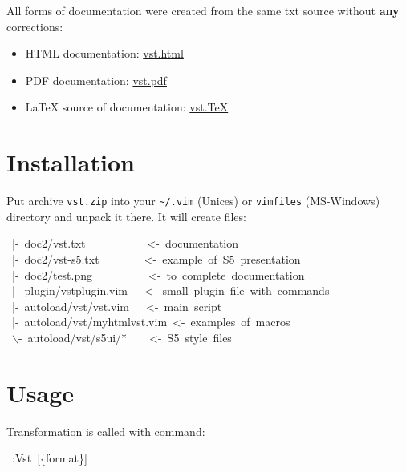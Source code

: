 \documentclass[12pt]{article}
\begin{document}
All forms of documentation were created from the same txt source without
\textbf{any} corrections:

\begin{itemize}
\item
HTML documentation: \href{http://skawina.eu.org/mikolaj/vst.html}{vst.html}

\item
PDF documentation: \href{http://skawina.eu.org/mikolaj/vst.pdf}{vst.pdf}

\item
\LaTeX{} source of documentation: \href{http://skawina.eu.org/mikolaj/vst.TeX}{vst.\TeX{}}
\end{itemize}

\hypertarget{larchive}{}

\hypertarget{linstallation}{}
\section{Installation}

Put archive \texttt{vst.zip} into your \texttt{\~{}/.vim} (Unices) or \texttt{vimfiles}
(MS-Windows) directory and unpack it there. It will create files:

\begin{ttfamily}\begin{flushleft}
\mbox{~|-~doc2/vst.txt~~~~~~~~~~~<-~documentation}\\
\mbox{~|-~doc2/vst-s5.txt~~~~~~~~<-~example~of~S5~presentation}\\
\mbox{~|-~doc2/test.png~~~~~~~~~~<-~to~complete~documentation}\\
\mbox{~|-~plugin/vstplugin.vim~~~<-~small~plugin~file~with~commands}\\
\mbox{~|-~autoload/vst/vst.vim~~~<-~main~script}\\
\mbox{~|-~autoload/vst/myhtmlvst.vim~<-~examples~of~macros}\\
\mbox{~$\backslash$-~autoload/vst/s5ui/*~~~~<-~S5~style~files}\\
\end{flushleft}\end{ttfamily}

\hypertarget{lusage}{}
\section{Usage}

Transformation is called with command:

\begin{ttfamily}\begin{flushleft}
\mbox{~:Vst~[\{format\}]}\\
\end{flushleft}\end{ttfamily}
\end{document}
